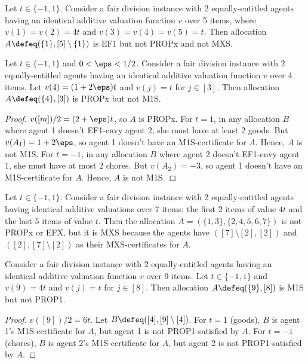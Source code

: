 \begin{example}
\label{cex:ef1-not-propx-mxs}
Let $t \in \{-1, 1\}$.
Consider a fair division instance with 2 equally-entitled agents
having an identical additive valuation function $v$ over 5 items,
where $v(1) = v(2) = 4t$ and $v(3) = v(4) = v(5) = t$.
Then allocation $A \defeq (\{1\}, [5] \setminus \{1\})$ is EF1 but not PROPx and not MXS.
\end{example}

\begin{lemma}
\label{cex:propx-not-m1s}
Let $t \in \{-1, 1\}$ and $0 < \eps < 1/2$.
Consider a fair division instance with 2 equally-entitled agents having
an identical additive valuation function $v$ over 4 items.
Let $v(4) = (1+2\eps)t$ and $v(j) = t$ for $j \in [3]$.
Then allocation $A \defeq (\{4\}, [3])$ is PROPx but not M1S.
\end{lemma}
\begin{proof}
$v([m])/2 = (2+\eps)t$, so $A$ is PROPx.
%
For $t = 1$, in any allocation $B$ where agent 1 doesn't EF1-envy agent 2, she must have at least 2 goods.
But $v(A_1) = 1+2\eps$, so agent 1 doesn't have an M1S-certificate for $A$. Hence, $A$ is not M1S.
%
For $t = -1$, in any allocation $B$ where agent 2 doesn't EF1-envy agent 1, she must have at most 2 chores.
But $v(A_2) = -3$, so agent 1 doesn't have an M1S-certificate for $A$. Hence, $A$ is not M1S.
\end{proof}

\begin{example}[MXS $\nfimplies$ PROPx for $n=2$]
\label{cex:mxs-not-propx-n2}
Let $t \in \{-1, 1\}$.
Consider a fair division instance with 2 equally-entitled agents
having identical additive valuations over 7 items:
the first 2 items of value $4t$ and the last 5 items of value $t$.
Then the allocation $A = (\{1, 3\}, \{2, 4, 5, 6, 7\})$ is not PROPx or EFX,
but it is MXS because the agents have $([7] \setminus [2], [2])$
and $([2], [7] \setminus [2])$ as their MXS-certificates for $A$.
\end{example}

\begin{lemma}
\label{cex:m1s-not-prop1}
Consider a fair division instance with 2 equally-entitled agents
having an identical additive valuation function $v$ over 9 items.
Let $t \in \{-1, 1\}$ and $v(9) = 4t$ and $v(j) = t$ for $j \in [8]$.
Then allocation $A \defeq (\{9\}, [8])$ is M1S but not PROP1.
\end{lemma}
\begin{proof}
$v([9])/2 = 6t$. Let $B \defeq ([4], [9] \setminus [4])$.
%
For $t = 1$ (goods), $B$ is agent 1's M1S-certificate for $A$,
but agent 1 is not PROP1-satisfied by $A$.
%
For $t = -1$ (chores), $B$ is agent 2's M1S-certificate for $A$,
but agent 2 is not PROP1-satisfied by $A$.
\end{proof}

